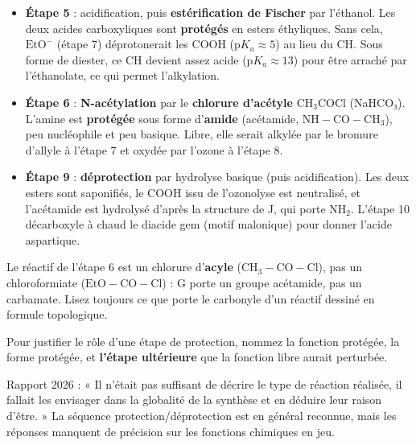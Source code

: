 \documentclass[11pt,a4paper]{article}
\providecommand{\tightlist}{\setlength{\itemsep}{0pt}\setlength{\parskip}{0pt}}
\begin{document}
\begin{itemize}
\tightlist
\item
  \textbf{Étape 5} : acidification, puis \textbf{estérification de Fischer} par l'éthanol. Les deux acides carboxyliques sont \textbf{protégés} en esters éthyliques. Sans cela, \(\mathrm{EtO^-}\) (étape 7) déprotonerait les COOH (\(\mathrm{p}K_a\approx5\)) au lieu du CH. Sous forme de diester, ce CH devient assez acide (\(\mathrm{p}K_a\approx13\)) pour être arraché par l'éthanolate, ce qui permet l'alkylation.
\item
  \textbf{Étape 6} : \textbf{N-acétylation} par le \textbf{chlorure d'acétyle} \(\mathrm{CH_3COCl}\) (NaHCO₃). L'amine est \textbf{protégée} sous forme d'\textbf{amide} (acétamide, \(\mathrm{NH{-}CO{-}CH_3}\)), peu nucléophile et peu basique. Libre, elle serait alkylée par le bromure d'allyle à l'étape 7 et oxydée par l'ozone à l'étape 8.
\item
  \textbf{Étape 9} : \textbf{déprotection} par hydrolyse basique (puis acidification). Les deux esters sont saponifiés, le COOH issu de l'ozonolyse est neutralisé, et l'acétamide est hydrolysé d'après la structure de J, qui porte \(\mathrm{NH_2}\). L'étape 10 décarboxyle à chaud le diacide gem (motif malonique) pour donner l'acide aspartique.
\end{itemize}

\begin{piege}

Le réactif de l'étape 6 est un chlorure d'\textbf{acyle} (\(\mathrm{CH_3{-}CO{-}Cl}\)), pas un chloroformiate (\(\mathrm{EtO{-}CO{-}Cl}\)) : G porte un groupe acétamide, pas un carbamate. Lisez toujours ce que porte le carbonyle d'un réactif dessiné en formule topologique.

\end{piege}

\begin{methode}

Pour justifier le rôle d'une étape de protection, nommez la fonction protégée, la forme protégée, et \textbf{l'étape ultérieure} que la fonction libre aurait perturbée.

\end{methode}

\begin{jury}

Rapport 2026 : « Il n'était pas suffisant de décrire le type de réaction réalisée, il fallait les envisager dans la globalité de la synthèse et en déduire leur raison d'être. » La séquence protection/déprotection est en général reconnue, mais les réponses manquent de précision sur les fonctions chimiques en jeu.

\end{jury}
\end{document}

